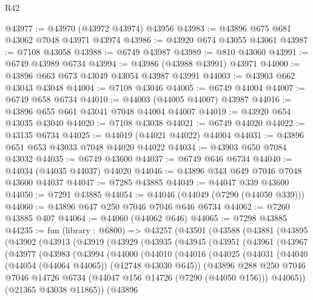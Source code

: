 \begin{lexlean}{R42}
\begin{coremodule}
{@43977 := @43970 (@43972 @43974) @43956
@43983 := @43896 @675 @681 @43062 @7048 @43971 @43974
@43986 := @43920 @674 @43055 @43061
@43987 := @7108 @43058
@43988 := @6749 @43987
@43989 := @810 @43060
@43991 := @6749 @43989 @6734
@43994 := @43986 (@43988 @43991) @43971
@44000 := @43896 @663 @673 @43049 @43054 @43987 @43991
@44003 := @43903 @662 @43043 @43048
@44004 := @7108 @43046
@44005 := @6749 @44004
@44007 := @6749 @658 @6734
@44010 := @44003 (@44005 @44007) @43987
@44016 := @43896 @655 @661 @43041 @7048 @44004 @44007
@44019 := @43920 @654 @43035 @43040
@44020 := @7108 @43038
@44021 := @6749 @44020
@44022 := @43135 @6734
@44025 := @44019 (@44021 @44022) @44004
@44031 := @43896 @651 @653 @43033 @7048 @44020 @44022
@44034 := @43903 @650 @7084 @43032
@44035 := @6749 @43600
@44037 := @6749 @646 @6734
@44040 := @44034 (@44035 @44037) @44020
@44046 := @43896 @343 @649 @7046 @7048 @43600 @44037
@44047 := @7285 @43885
@44049 := @44047 @339 @43600
@44050 := @7291 @43885
@44054 := @44046 (@44049 (@7290 (@44050 @339)))
@44060 := @43896 @647 @250 @7046 @7046 @646 @6734
@44062 := @7260 @43885 @407
@44064 := @44060 (@44062 @646)
@44065 := @7298 @43885
@44235 := fun (library : @6800) =>
  @43257
    (@43501
      (@43588
        (@43881
          (@43895
            (@43902
              (@43913
                (@43919
                  (@43929
                    (@43935
                      (@43945
                        (@43951
                          (@43961
                            (@43967
                              (@43977
                                (@43983
                                  (@43994
                                    (@44000
                                      (@44010
                                        (@44016
                                          (@44025
                                            (@44031
                                              (@44040 (@44054 (@44064 @44065)) (@12748 @43030 @645))
                                              (@43896
                                                @288
                                                @250
                                                @7046
                                                @7046
                                                @14726
                                                @6734
                                                (@44047 @156 @14726 (@7290 (@44050 @156)))
                                                @44065))
                                            (@21365 @43038 @11865))
                                          (@43896
}
\end{coremodule}
\end{lexlean}

